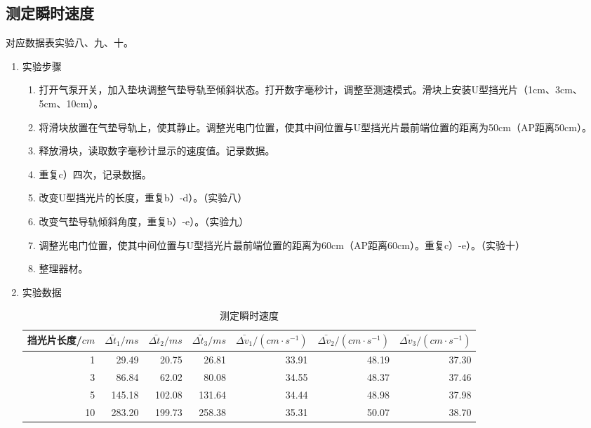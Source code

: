 \documentclass[11pt]{article}
\begin{document}
\subsection {测定瞬时速度}
对应数据表实验八、九、十。
\begin{enumerate}
    \item 实验步骤
    \begin{enumerate}
        \item 打开气泵开关，加入垫块调整气垫导轨至倾斜状态。打开数字毫秒计，调整至测速模式。滑块上安装U型挡光片（1cm、3cm、5cm、10cm）。
        \item 将滑块放置在气垫导轨上，使其静止。调整光电门位置，使其中间位置与U型挡光片最前端位置的距离为50cm（AP距离50cm）。
        \item 释放滑块，读取数字毫秒计显示的速度值。记录数据。
        \item 重复c）四次，记录数据。
        \item 改变U型挡光片的长度，重复b）-d）。（实验八）
        \item 改变气垫导轨倾斜角度，重复b）-e）。（实验九）
        \item 调整光电门位置，使其中间位置与U型挡光片最前端位置的距离为60cm（AP距离60cm）。重复c）-e）。（实验十）
        \item 整理器材。
    \end{enumerate}
    \item 实验数据
        
        \begin{table}[H]
          \centering
          \caption{测定瞬时速度}
            \begin{tabular}{|r|r|r|r|r|r|r|}\hline
            挡光片长度/$cm$ & $\bar{\Delta t_{1}}/ms$ & $\bar{\Delta t_{2}}/ms$ & $\bar{\Delta t_{3}}/ms$ & $\bar{\Delta v_{1}}/(cm \cdot s^{-1})$ & $\bar{\Delta v_{2}}/(cm \cdot s^{-1})$ & $\bar{\Delta v_{3}}/(cm \cdot s^{-1})$ \\\hline
            1    & 29.49  & 20.75  & 26.81  & 33.91  & 48.19  & 37.30  \\\hline
            3    & 86.84  & 62.02  & 80.08  & 34.55  & 48.37  & 37.46  \\\hline
            5    & 145.18  & 102.08  & 131.64  & 34.44  & 48.98  & 37.98  \\\hline
            10   & 283.20  & 199.73  & 258.38  & 35.31  & 50.07  & 38.70  \\\hline
            \end{tabular}%
          \label{tab:瞬时速度}%
        \end{table}%
        

\end{enumerate}
\end{document}
